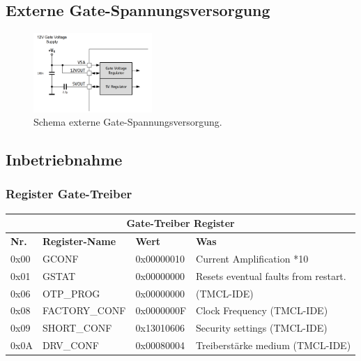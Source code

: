 \subsection{Externe Gate-Spannungsversorgung}\label{Appendix:Gate_Spannungsversorgung}

\begin{figure}[H]
	\centering
	\includegraphics[width=0.4\textwidth]{graphics/Schema_Gate_Treiber_Gatespannung}
	\caption{Schema externe Gate-Spannungsversorgung.\cite[S.11]{trinamicmotion_control_gmbh__co_kg_tmc6200_2019}}
	\label{fig:Schema_Gate_Treiber_Gatespannung}
\end{figure}

\subsection{Inbetriebnahme}


\subsubsection{Register Gate-Treiber}\label{Appendix:TMC6200_Register}

\begin{table}[H]
\centering
\begin{tabular}{|l|l|l|l|}
\hline
\multicolumn{4}{|c|}{\textbf{Gate-Treiber Register}}          \\ \hline
\textbf{Nr.} & \textbf{Register-Name} & \textbf{Wert}       & \textbf{Was} \\ \hline
0x00         & GCONF         & 0x00000010 & Current Amplification *10    \\ \hline
0x01         & GSTAT         & 0x00000000 & Resets eventual faults from restart.    \\ \hline
0x06         & OTP\_PROG     & 0x00000000 & (TMCL-IDE)    \\ \hline
0x08         & FACTORY\_CONF & 0x0000000F & Clock Frequency (TMCL-IDE)    \\ \hline
0x09         & SHORT\_CONF   & 0x13010606 & Security settings (TMCL-IDE)    \\ \hline
0x0A         & DRV\_CONF     & 0x00080004 & Treiberstärke medium (TMCL-IDE)    \\ \hline
\end{tabular}
\end{table}

